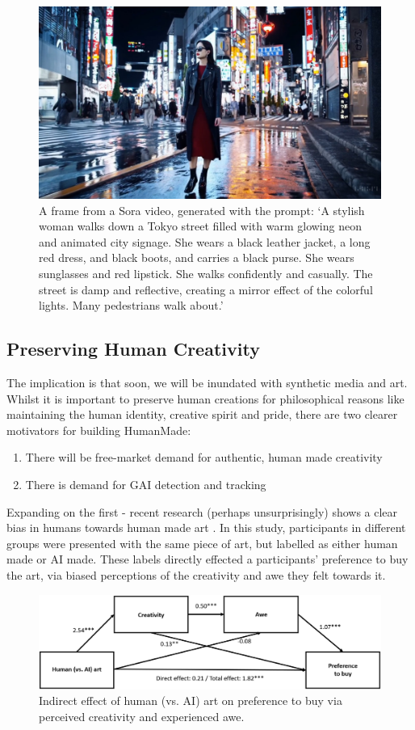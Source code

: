 \documentclass[12pt,a4paper]{article}
\begin{document}
\begin{figure}[H]
    \centering
    \includegraphics[scale=0.4]{sora.jpg}
    \caption{A frame from a Sora video, generated with the prompt: `A stylish woman walks down a Tokyo street filled with warm glowing neon and animated city signage. She wears a black leather jacket, a long red dress, and black boots, and carries a black purse. She wears sunglasses and red lipstick. She walks confidently and casually. The street is damp and reflective, creating a mirror effect of the colorful lights. Many pedestrians walk about.'}
\end{figure}
\subsection{Preserving Human Creativity}
The implication is that soon, we will be inundated with synthetic media and art. Whilst it is important to preserve human creations for philosophical reasons like maintaining the human identity, creative spirit and pride, there are two clearer motivators for building HumanMade:
\begin{enumerate}
    \item There will be free-market demand for authentic, human made creativity
    \item There is demand for GAI detection and tracking
\end{enumerate}
Expanding on the first - recent research (perhaps unsurprisingly) shows a clear bias in humans towards human made art \cite{anthropocentric}. In this study, participants in different groups were presented with the same piece of art, but labelled as either human made or AI made. These labels directly effected a participants' preference to buy the art, via biased perceptions of the creativity and awe they felt towards it.
\begin{figure}[H]
    \centering
    \includegraphics[scale=1]{biasDiagram.jpg}
    \caption{Indirect effect of human (vs. AI) art on preference to buy via perceived creativity and experienced awe.}
\end{figure}
\end{document}
